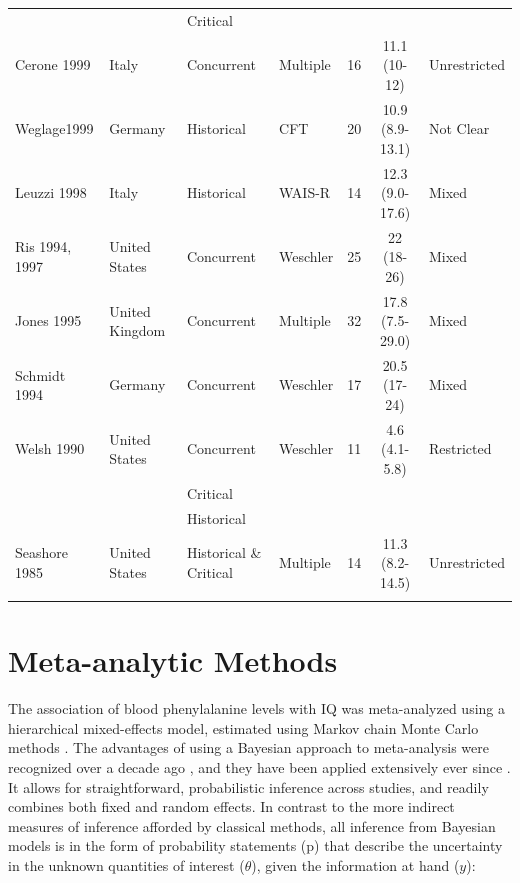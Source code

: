 \documentclass{svjour3}                     %
\begin{document}
\begin{table}
\begin{tabular}{llllccl}
    & & Critical & & &\\
    Cerone 1999 & Italy & Concurrent & Multiple & 16 & 11.1 (10-12) & Unrestricted\\
    Weglage1999 & Germany & Historical & CFT & 20 & 10.9 (8.9-13.1) & Not Clear\\
    Leuzzi 1998 & Italy & Historical & WAIS-R & 14 & 12.3 (9.0-17.6) & Mixed\\
    Ris 1994, 1997 & United States & Concurrent & Weschler & 25 & 22 (18-26) & Mixed\\
    Jones 1995 & United Kingdom & Concurrent & Multiple & 32 & 17.8 (7.5-29.0) & Mixed\\
    Schmidt 1994 & Germany & Concurrent & Weschler & 17 & 20.5 (17-24) & Mixed\\
    Welsh 1990 & United States & Concurrent & Weschler & 11 & 4.6 (4.1-5.8) & Restricted\\
    & & Critical & & &  & \\
    & & Historical & & &  & \\
    Seashore 1985 & United States & Historical \& Critical & Multiple & 14 & 11.3 (8.2-14.5) & Unrestricted\\
    \noalign{\smallskip}\hline
    \end{tabular}

\end{table}




\section{Meta-analytic Methods} %
\label{sec:Meta-analytic Methods}

The association of blood phenylalanine levels with IQ was meta-analyzed using a hierarchical mixed-effects model, estimated using Markov chain Monte Carlo methods \citep{Gelman:2003vk}. The advantages of using a Bayesian approach to meta-analysis were recognized over a decade ago \citep{Smith:1995vk}, and they have been applied extensively ever since \citep{Tweedie:1996vy, Sutton:2001tq, Brophy:2001vu, Brophy:2003vv, Babapulle:2004tp, Kaizar:2006io, Afilalo:2008ir}. It allows for straightforward, probabilistic inference across studies, and readily combines both fixed and random effects. In contrast to the more indirect measures of inference afforded by classical methods, all inference from Bayesian models is in the form of probability statements (p) that describe the uncertainty in the unknown quantities of interest ($\theta$), given the information at hand ($y$):
\end{document}
